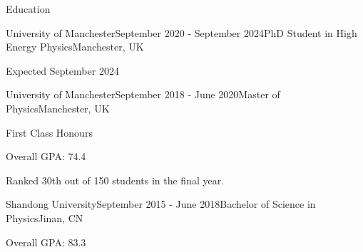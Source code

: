 \documentclass{resume} %
\begin{document}
    \begin{rSection}{Education}
        \begin{rSubsection}{University of Manchester}{September 2020 - September 2024}{PhD Student in High Energy Physics}{Manchester, UK}
            \item Expected September 2024 
        \end{rSubsection}
        \begin{rSubsection}{University of Manchester}{September 2018 - June 2020}{Master of Physics}{Manchester, UK}
            \item First Class Honours
            \item Overall GPA: 74.4
            \item Ranked 30th out of 150 students in the final year.
        \end{rSubsection}
        \begin{rSubsection}{Shandong University}{September 2015 - June 2018}{Bachelor of Science in Physics}{Jinan, CN}
            \item Overall GPA: 83.3
        \end{rSubsection}
    \end{rSection}
\end{document}
